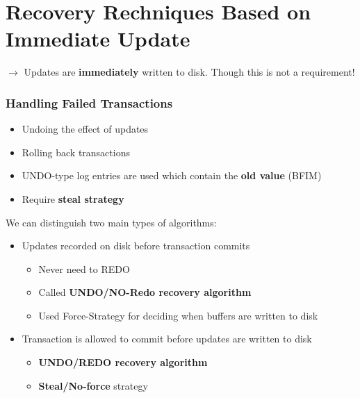 \section{Recovery Rechniques Based on Immediate Update}
$\rightarrow$ Updates are \textbf{immediately} written to disk. Though this is not a requirement!
\subsubsection{Handling Failed Transactions}
\begin{itemize}
	\item Undoing the effect of updates
	\item Rolling back transactions
	\item UNDO-type log entries are used which contain the \textbf{old value} (BFIM)
	\item Require \textbf{steal strategy}
\end{itemize}
We can distinguish two main types of algorithms:
\begin{itemize}
	\item Updates recorded on disk before transaction commits
	\begin{itemize}
		\item Never need to REDO
		\item Called \textbf{UNDO/NO-Redo recovery algorithm}
		\item Used Force-Strategy for deciding when buffers are written to disk
	\end{itemize}
	\item Transaction is allowed to commit before updates are written to disk
	\begin{itemize}
		\item \textbf{UNDO/REDO recovery algorithm}
		\item \textbf{Steal/No-force} strategy
	\end{itemize}
\end{itemize}
